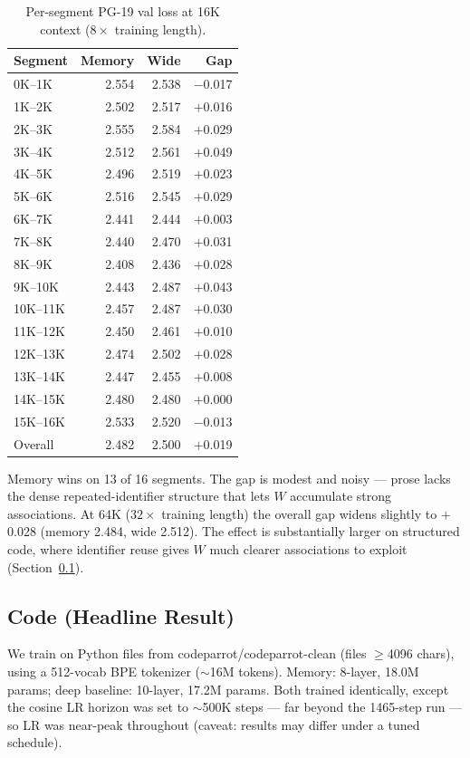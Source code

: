 \documentclass{article}
\begin{document}
\begin{table}[h]
\centering
\caption{Per-segment PG-19 val loss at 16K context ($8\times$ training length).}
\begin{tabular}{lrrr}
\toprule
Segment & Memory & Wide & Gap \\
\midrule
0K--1K   & 2.554 & 2.538 & $-$0.017 \\
1K--2K   & 2.502 & 2.517 & $+$0.016 \\
2K--3K   & 2.555 & 2.584 & $+$0.029 \\
3K--4K   & 2.512 & 2.561 & $+$0.049 \\
4K--5K   & 2.496 & 2.519 & $+$0.023 \\
5K--6K   & 2.516 & 2.545 & $+$0.029 \\
6K--7K   & 2.441 & 2.444 & $+$0.003 \\
7K--8K   & 2.440 & 2.470 & $+$0.031 \\
8K--9K   & 2.408 & 2.436 & $+$0.028 \\
9K--10K  & 2.443 & 2.487 & $+$0.043 \\
10K--11K & 2.457 & 2.487 & $+$0.030 \\
11K--12K & 2.450 & 2.461 & $+$0.010 \\
12K--13K & 2.474 & 2.502 & $+$0.028 \\
13K--14K & 2.447 & 2.455 & $+$0.008 \\
14K--15K & 2.480 & 2.480 & $+$0.000 \\
15K--16K & 2.533 & 2.520 & $-$0.013 \\
\midrule
Overall  & 2.482 & 2.500 & $+$0.019 \\
\bottomrule
\end{tabular}
\end{table}

Memory wins on 13 of 16 segments. The gap is modest and noisy --- prose lacks the dense repeated-identifier structure that lets $W$ accumulate strong associations. At 64K ($32\times$ training length) the overall gap widens slightly to $+$0.028 (memory 2.484, wide 2.512). The effect is substantially larger on structured code, where identifier reuse gives $W$ much clearer associations to exploit (Section~\ref{sec:code}).

\FloatBarrier
\subsection{Code (Headline Result)}
\label{sec:code}

We train on Python files from codeparrot/codeparrot-clean (files $\geq$4096 chars), using a 512-vocab BPE tokenizer (${\sim}$16M tokens). Memory: 8-layer, 18.0M params; deep baseline: 10-layer, 17.2M params. Both trained identically, except the cosine LR horizon was set to ${\sim}$500K steps --- far beyond the 1465-step run --- so LR was near-peak throughout (caveat: results may differ under a tuned schedule).
\end{document}

